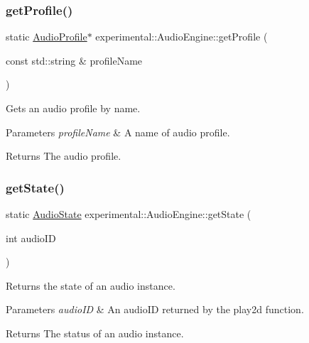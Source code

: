 \subsubsection{\texorpdfstring{get\+Profile()}{getProfile()}\hspace{0.1cm}{\footnotesize\ttfamily [4/4]}}
{\footnotesize\ttfamily static \hyperlink{classexperimental_1_1AudioProfile}{Audio\+Profile}$\ast$ experimental\+::\+Audio\+Engine\+::get\+Profile (\begin{DoxyParamCaption}\item[{const std\+::string \&}]{profile\+Name }\end{DoxyParamCaption})\hspace{0.3cm}{\ttfamily [static]}}

Gets an audio profile by name.


\begin{DoxyParams}{Parameters}
{\em profile\+Name} & A name of audio profile. \\
\hline
\end{DoxyParams}
\begin{DoxyReturn}{Returns}
The audio profile. 
\end{DoxyReturn}
\mbox{\label{classexperimental_1_1AudioEngine_a866cda5e583d0dce1b74fa596cae8ac1}} 
\subsubsection{\texorpdfstring{get\+State()}{getState()}\hspace{0.1cm}{\footnotesize\ttfamily [1/2]}}
{\footnotesize\ttfamily static \hyperlink{classexperimental_1_1AudioEngine_ab7becf9cab1f5e4cac089a1f6e3785e6}{Audio\+State} experimental\+::\+Audio\+Engine\+::get\+State (\begin{DoxyParamCaption}\item[{int}]{audio\+ID }\end{DoxyParamCaption})\hspace{0.3cm}{\ttfamily [static]}}

Returns the state of an audio instance.


\begin{DoxyParams}{Parameters}
{\em audio\+ID} & An audio\+ID returned by the play2d function. \\
\hline
\end{DoxyParams}
\begin{DoxyReturn}{Returns}
The status of an audio instance. 
\end{DoxyReturn}
\mbox{\label{classexperimental_1_1AudioEngine_a866cda5e583d0dce1b74fa596cae8ac1}} 
